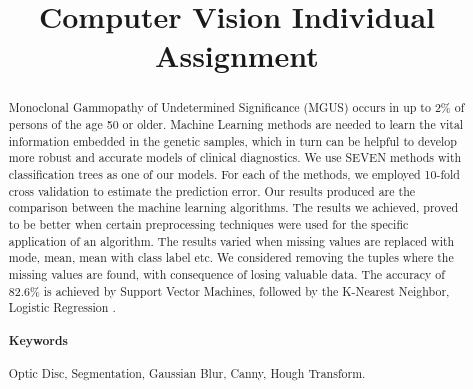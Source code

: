 \documentclass[conference]{IEEEtran}
\author{
    \IEEEauthorblockN{Shashank Reddy B\IEEEauthorrefmark{1}}
    \IEEEauthorblockA{\IEEEauthorrefmark{1} School of Computing\\   { { University of New South Wales}}
    \\\{z5222766\}@student.unsw.edu.au}
}
\begin{document}
\title{Computer Vision Individual Assignment}


\maketitle

\begin{abstract}
 Monoclonal Gammopathy of Undetermined Significance (MGUS) occurs in up to 2\% of persons of the age 50 or older. Machine Learning methods are needed to learn the vital information embedded in the genetic samples, which in turn can be helpful to develop more robust and accurate models of clinical diagnostics. We use SEVEN methods with classification trees as one of our models. For each of the methods, we employed 10-fold cross validation to estimate the prediction error. Our results  produced are the comparison between the machine learning algorithms. 
 The results we achieved, proved to be better when certain preprocessing techniques were used for the specific application of an algorithm. The results varied when missing values are replaced with mode, mean, mean with class label etc. We considered removing the tuples where the missing values are found, with consequence of losing valuable data. The accuracy of 82.6\% is achieved by 	Support Vector Machines, followed by the K-Nearest Neighbor, Logistic Regression  .

\paragraph*{Keywords}
Optic Disc, Segmentation, Gaussian Blur, Canny, Hough Transform.

\end{abstract}




%
\IEEEpeerreviewmaketitle
\end{document}
